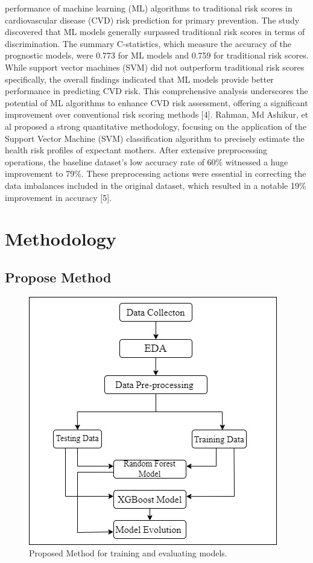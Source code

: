 \documentclass[conference]{IEEEtran}
\begin{document}
performance of machine learning (ML) algorithms to traditional risk scores in cardiovascular disease (CVD) risk prediction for primary prevention. The study discovered that ML models generally surpassed traditional risk scores in terms of discrimination. The summary C-statistics, which measure the accuracy of the prognostic models, were 0.773 for ML models and 0.759 for traditional risk scores. While support vector machines (SVM) did not outperform traditional risk scores specifically, the overall findings indicated that ML models provide better performance in predicting CVD risk. This comprehensive analysis underscores the potential of ML algorithms to enhance CVD risk assessment, offering a significant improvement over conventional risk scoring methods [4]. Rahman, Md Ashikur, et al proposed a strong quantitative methodology, focusing on the application of the Support Vector Machine (SVM) classification algorithm to precisely estimate the health risk profiles of expectant mothers. After extensive preprocessing operations, the baseline dataset's low accuracy rate of 60\% witnessed a huge improvement to 79\%. These preprocessing actions were essential in correcting the data imbalances included in the original dataset, which resulted in a notable 19\% improvement in accuracy [5].

\section{Methodology}


\subsection{Propose Method}
\begin{figure}[H]
    \centerline{\includegraphics[width=0.7\linewidth]{fig1.jpg}}
    \caption{Proposed Method for training and evaluating models.}
    \label{fig1}
\end{figure}
\end{document}
